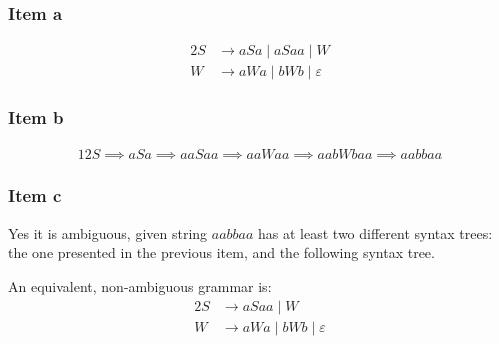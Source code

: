 {\subsubsection{Item a}
\begin{alignat*}{2}
	S &\rightarrow aSa\mid aSaa\mid W\\
	W &\rightarrow aWa\mid bWb\mid \varepsilon
\end{alignat*}
\subsubsection{Item b}
\begin{minipage}[c]{0.68\textwidth}
	\begin{alignat*}{12}
		S \implies aSa \implies aaSaa \implies aaWaa \implies aabWbaa \implies aabbaa
	\end{alignat*}
\end{minipage}
\begin{minipage}[c]{0.3\textwidth}
	\begin{center}
	\end{center}
\end{minipage}
\subsubsection{Item c}
Yes it is ambiguous, given string $aabbaa$ has at least two different syntax trees: the one presented in the previous item, and the following syntax tree.
\begin{center}
\end{center}
An equivalent, non-ambiguous grammar is:
\begin{alignat*}{2}
	S &\rightarrow aSaa\mid W\\
	W &\rightarrow aWa\mid bWb\mid \varepsilon
\end{alignat*}
}
